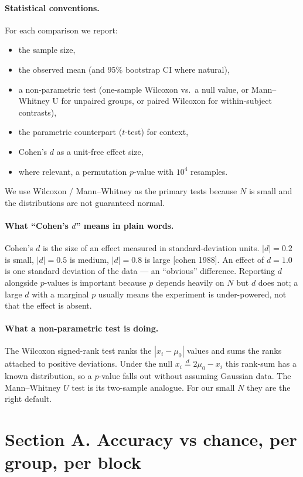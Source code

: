 \documentclass[11pt]{article}
\begin{document}
\paragraph{Statistical conventions.}
For each comparison we report:
\begin{itemize}
\item the sample size,
\item the observed mean (and 95\% bootstrap CI where natural),
\item a non-parametric test (one-sample Wilcoxon vs.\ a null value, or
      Mann--Whitney U for unpaired groups, or paired Wilcoxon for
      within-subject contrasts),
\item the parametric counterpart ($t$-test) for context,
\item Cohen's $d$ as a unit-free effect size,
\item where relevant, a permutation $p$-value with $10^4$ resamples.
\end{itemize}
We use Wilcoxon / Mann--Whitney as the primary tests because $N$ is
small and the distributions are not guaranteed normal.

\paragraph{What ``Cohen's $d$'' means in plain words.}
Cohen's $d$ is the size of an effect measured in standard-deviation
units.  $|d|=0.2$ is small, $|d|=0.5$ is medium, $|d|=0.8$ is large [cohen 1988].
An effect of $d=1.0$ is one standard deviation
of the data --- an ``obvious'' difference.  Reporting $d$ alongside
$p$-values is important because $p$ depends heavily on $N$ but $d$
does not; a large $d$ with a marginal $p$ usually means the experiment
is under-powered, not that the effect is absent.

\paragraph{What a non-parametric test is doing.}
The Wilcoxon signed-rank test ranks the $|x_i - \mu_0|$ values and
sums the ranks attached to positive deviations.  Under the null
$x_i \overset{d}{=} 2\mu_0 - x_i$ this rank-sum has a known
distribution, so a $p$-value falls out without assuming Gaussian
data.  The Mann--Whitney $U$ test is its two-sample analogue.  For our
small $N$ they are the right default.

\section{Section A.  Accuracy vs chance, per group, per block}
\end{document}
